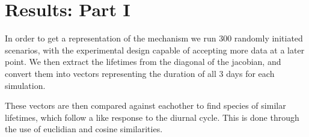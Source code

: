 
\section{Results: Part I}

In order to get a representation of the mechanism we run 300 randomly initiated scenarios, with the experimental design capable of accepting more data at a later point. We then extract the lifetimes from the diagonal of the jacobian, and convert them into vectors representing the duration of all 3 days for each simulation. 



These vectors are then compared against eachother to find species of similar lifetimes, which follow a like response to the diurnal cycle. This is done through the use of euclidian and cosine similarities. 
